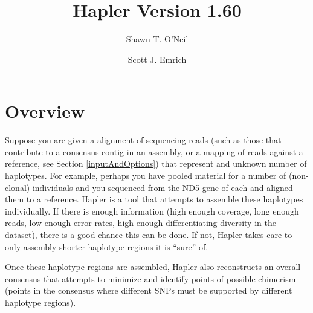 \documentclass[11pt]{llncs}
\begin{document}
%
%
\mainmatter              %
%
\title{Hapler Version 1.60}
%
%
\author{Shawn T. O'Neil \and Scott J. Emrich}
%
%
%




\maketitle              %


\setcounter{tocdepth}{3}
\tableofcontents

\newpage


%

\section{Overview} 
\label{overview}

Suppose you are given a alignment of sequencing reads (such as those that contribute to a consensus contig in an assembly, or a mapping of reads against 
a reference, see Section 
\ref{inputAndOptions}) that represent and unknown number of haplotypes. For example, perhaps you have pooled material for a number of (non-clonal) 
individuals and you sequenced from the ND5 gene of each and aligned them to a reference. Hapler is a tool that attempts to assemble these 
haplotypes individually. If there is enough information (high enough coverage, long enough reads, low enough error rates, high enough differentiating 
diversity in the dataset), there is a good chance this can be done. If not, Hapler takes care to only assembly shorter haplotype regions it is 
``sure'' of.

Once these haplotype regions are assembled, Hapler also reconstructs an overall consensus that attempts to minimize and identify points of
possible chimerism (points in the 
consensus where different SNPs must be supported by different haplotype regions).
\end{document}
